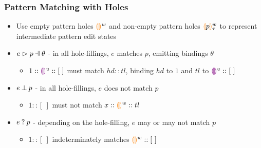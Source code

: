 \documentclass{beamer}
\begin{document}
\begin{frame}
\frametitle{Pattern Matching with Holes}
\begin{itemize}
\item Use empty pattern holes $\textcolor{orange}{\llparenthesis}\textcolor{orange}{\rrparenthesis}^{w}$ and non-empty pattern holes $\textcolor{orange}{\llparenthesis} p\textcolor{orange}{\rrparenthesis}^{w}_{\tau}$ to represent intermediate pattern edit states\\
\medskip
\item $\hpatmatch{e}{p}{\theta}$ - in all hole-fillings, $e$ matches $p$, emitting bindings $\theta$\\

\begin{itemize}
\item $1::\textcolor{violet}{\llparenthesis}\textcolor{violet}{\rrparenthesis}^{u}::[~]$ must match $hd :: tl$, binding $hd$ to $1$ and $tl$ to $\textcolor{violet}{\llparenthesis}\textcolor{violet}{\rrparenthesis}^{u}::[~]$
\end{itemize}
\medskip
\item $e \mathbin{\bot} p$ - in all hole-fillings, $e$ does not match $p$\\

\begin{itemize}
\item $1::[~]$ must not match $x::\textcolor{orange}{\llparenthesis}\textcolor{orange}{\rrparenthesis}^{w}::tl$
\end{itemize}
\medskip
\item $e \mathbin{?} p$ - depending on the hole-filling, $e$ may or may not match $p$\\

\begin{itemize}
\item $1::[~]$ indeterminately matches $\textcolor{orange}{\llparenthesis}\textcolor{orange}{\rrparenthesis}^{w}::[~]$\\
\end{itemize}
\end{itemize}
\end{frame}
\end{document}
